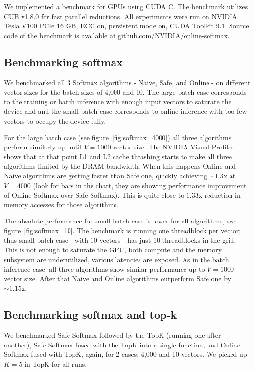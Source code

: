 We implemented a benchmark for GPUs using CUDA C. The benchmark utilizes \href{https://nvlabs.github.io/cub/}{CUB} v1.8.0 for fast parallel reductions. All experiments were run on NVIDIA Tesla V100 PCIe 16 GB, ECC on, persistent mode on, CUDA Toolkit 9.1. Source code of the benchmark is available at \href{https://github.com/NVIDIA/online-softmax}{github.com/NVIDIA/online-softmax}.

\subsection{Benchmarking softmax}

We benchmarked all 3 Softmax algorithms - Naive, Safe, and Online - on different vector sizes for the batch sizes of 4,000 and 10. The large batch case corresponds to the training or batch inference with enough input vectors to saturate the device and and the small batch case corresponds to online inference with too few vectors to occupy the device fully.

For the large batch case (see figure~\ref{fig:softmax_4000}) all three algorithms perform similarly up until $V=1000$ vector size. The NVIDIA Visual Profiler shows that at that point L1 and L2 cache thrashing starts to make all three algorithms limited by the DRAM bandwidth. When this happens Online and Naive algorithms are getting faster than Safe one, quickly achieving $\sim 1.3$x at $V=4000$ (look for bars in the chart, they are showing performance improvement of Online Softmax over Safe Softmax). This is quite close to $1.33$x reduction in memory accesses for those algorithms.

The absolute performance for small batch case is lower for all algorithms, see figure~\ref{fig:softmax_10}. The benchmark is running one threadblock per vector; thus small batch case - with 10 vectors - has just 10 threadblocks in the grid. This is not enough to saturate the GPU, both compute and the memory subsystem are underutilized, various latencies are exposed. As in the batch inference case, all three algorithms show similar performance up to $V=1000$ vector size. After that Naive and Online algorithms outperform Safe one by $\sim 1.15$x.

\subsection{Benchmarking softmax and top-k}

We benchmarked Safe Softmax followed by the TopK (running one after another), Safe Softmax fused with the TopK into a single function, and Online Softmax fused with TopK, again, for 2 cases: 4,000 and 10 vectors. We picked up $K=5$ in TopK for all runs.

